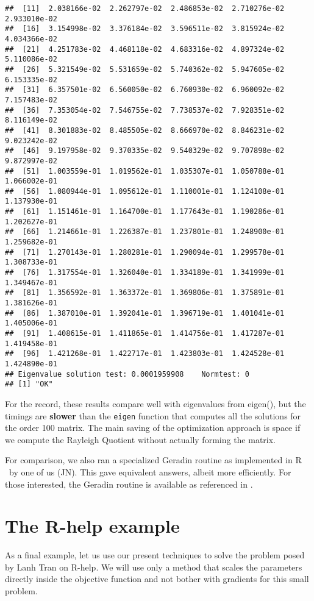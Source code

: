 \documentclass[11pt]{article}\usepackage[]{graphicx}\usepackage[]{color}
\makeatletter
\newenvironment{kframe}{%
 \def\at@end@of@kframe{}%
 \ifinner\ifhmode%
  \def\at@end@of@kframe{\end{minipage}}%
  \begin{minipage}{\columnwidth}%
 \fi\fi%
 \def\FrameCommand##1{\hskip\@totalleftmargin \hskip-\fboxsep
 \colorbox{shadecolor}{##1}\hskip-\fboxsep
     \hskip-\linewidth \hskip-\@totalleftmargin \hskip\columnwidth}%
 \MakeFramed {\advance\hsize-\width
   \@totalleftmargin\z@ \linewidth\hsize
   \@setminipage}}%
 {\par\unskip\endMakeFramed%
 \at@end@of@kframe}
\newenvironment{knitrout}{}{} %
\newcommand{\B}[1]{{\bf #1 \rm}}
\newcommand{\R}{{\sf R }}
\newcommand{\code}[1]{{\tt#1}}
\makeatother
\begin{document}
\begin{knitrout}
\begin{kframe}
\begin{verbatim}
##  [11]  2.038166e-02  2.262797e-02  2.486853e-02  2.710276e-02  2.933010e-02
##  [16]  3.154998e-02  3.376184e-02  3.596511e-02  3.815924e-02  4.034366e-02
##  [21]  4.251783e-02  4.468118e-02  4.683316e-02  4.897324e-02  5.110086e-02
##  [26]  5.321549e-02  5.531659e-02  5.740362e-02  5.947605e-02  6.153335e-02
##  [31]  6.357501e-02  6.560050e-02  6.760930e-02  6.960092e-02  7.157483e-02
##  [36]  7.353054e-02  7.546755e-02  7.738537e-02  7.928351e-02  8.116149e-02
##  [41]  8.301883e-02  8.485505e-02  8.666970e-02  8.846231e-02  9.023242e-02
##  [46]  9.197958e-02  9.370335e-02  9.540329e-02  9.707898e-02  9.872997e-02
##  [51]  1.003559e-01  1.019562e-01  1.035307e-01  1.050788e-01  1.066002e-01
##  [56]  1.080944e-01  1.095612e-01  1.110001e-01  1.124108e-01  1.137930e-01
##  [61]  1.151461e-01  1.164700e-01  1.177643e-01  1.190286e-01  1.202627e-01
##  [66]  1.214661e-01  1.226387e-01  1.237801e-01  1.248900e-01  1.259682e-01
##  [71]  1.270143e-01  1.280281e-01  1.290094e-01  1.299578e-01  1.308733e-01
##  [76]  1.317554e-01  1.326040e-01  1.334189e-01  1.341999e-01  1.349467e-01
##  [81]  1.356592e-01  1.363372e-01  1.369806e-01  1.375891e-01  1.381626e-01
##  [86]  1.387010e-01  1.392041e-01  1.396719e-01  1.401041e-01  1.405006e-01
##  [91]  1.408615e-01  1.411865e-01  1.414756e-01  1.417287e-01  1.419458e-01
##  [96]  1.421268e-01  1.422717e-01  1.423803e-01  1.424528e-01  1.424890e-01
## Eigenvalue solution test: 0.0001959908    Normtest: 0 
## [1] "OK"
\end{verbatim}
\end{kframe}
\end{knitrout}

For the record, these results compare well with eigenvalues from eigen(), but the timings are
\B{slower} than the \code{eigen} function that computes all the solutions for the order 100 matrix.
The main saving of the optimization approach is space if we compute the Rayleigh Quotient without
actually forming the matrix.

For comparison, we also ran a specialized Geradin routine as implemented in \R\ by one of 
us (JN). This gave equivalent answers, albeit more efficiently. For those interested, the
Geradin routine is available as referenced in \citep{RQtimes12}.


\section{The R-help example}

As a final example, let us use our present techniques to solve the 
problem posed by Lanh Tran on R-help. We will use
only a method that scales the parameters directly inside the objective function and 
not bother with gradients for this small problem. 
\end{document}
